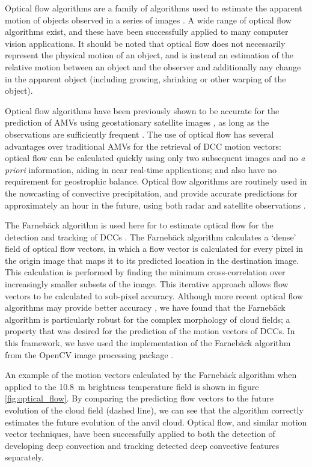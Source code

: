 \documentclass[amt, manuscript]{copernicus}
\begin{document}
Optical flow algorithms are a family of algorithms used to estimate the apparent motion of objects observed in a series of images \citep{aggarwal_computation_1988}. 
A wide range of optical flow algorithms exist, and these have been successfully applied to many computer vision applications. 
It should be noted that optical flow does not necessarily represent the physical motion of an object, and is instead an estimation of the relative motion between an object and the observer and additionally any change in the apparent object (including growing, shrinking or other warping of the object). 

Optical flow algorithms have been previously shown to be accurate for the prediction of AMVs using geostationary satellite images \citep{wu_deriving_2016}, as long as the observations are sufficiently frequent \citep{bresky_feasibility_2006}. 
The use of optical flow has several advantages over traditional AMVs for the retrieval of DCC motion vectors: optical flow can be calculated quickly using only two subsequent images and no \textit{a priori} information, aiding in near real-time applications; and also have no requirement for geostrophic balance. 
Optical flow algorithms are routinely used in the nowcasting of convective precipitation, and provide accurate predictions for approximately an hour in the future, using both radar and satellite observations \citep[e.g.,][]{bowler_development_2004, bechini_enhanced_2017, woo_operational_2017}.

The Farnebäck algorithm \citep{farneback_two-frame_2003} is used here for to estimate optical flow for the detection and tracking of DCCs .
The Farnebäck algorithm calculates a `dense' field of optical flow vectors, in which a flow vector is calculated for every pixel in the origin image that maps it to its predicted location in the destination image.
This calculation is performed by finding the minimum cross-correlation over increasingly smaller subsets of the image.
This iterative approach allows flow vectors to be calculated to sub-pixel accuracy.
Although more recent optical flow algorithms may provide better accuracy \citep{baker_database_2011}, we have found that the Farnebäck algorithm is particularly robust for the complex morphology of cloud fields; a property that was desired for the prediction of the motion vectors of DCCs.
In this framework, we have used the implementation of the Farnebäck algorithm from the OpenCV image processing package \citep{opencv_library}.

An example of the motion vectors calculated by the Farnebäck algorithm when applied to the 10.8~\textmu m brightness temperature field is shown in figure \ref{fig:optical_flow}.
By comparing the predicting flow vectors to the future evolution of the cloud field (dashed line), we can see that the algorithm correctly estimates the future evolution of the anvil cloud.
Optical flow, and similar motion vector techniques, have been successfully applied to both the detection of developing deep convection \citep{zinner_cb-tram:_2008, zhang_locating_2014} and tracking detected deep convective features \citep{senf_size-resolved_2018} separately.
\end{document}

